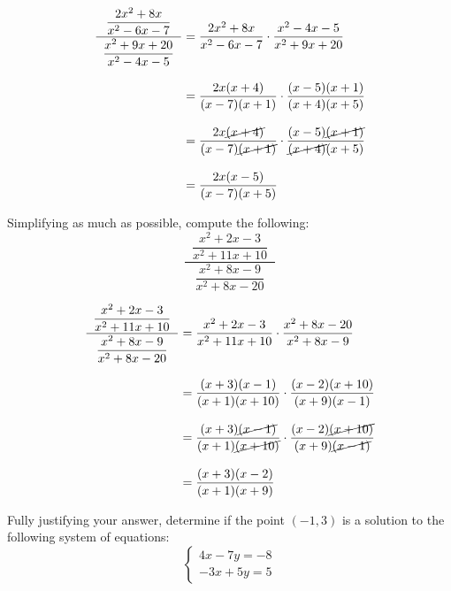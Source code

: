 \documentclass[11pt,letterpaper]{article}
\begin{document}
\sol
	\[
	\begin{aligned}
	\dfrac{\;\;\dfrac{2x^2 + 8x}{x^2 - 6x - 7}\;\;}{\;\;\dfrac{x^2 + 9x + 20}{x^2 - 4x - 5}\;\;}&= \dfrac{2x^2 + 8x}{x^2 - 6x - 7} \cdot \dfrac{x^2 - 4x - 5}{x^2 + 9x + 20} \\[0.3cm]
	&= \dfrac{2x(x + 4)}{(x - 7)(x + 1)} \cdot \dfrac{(x - 5)(x + 1)}{(x + 4)(x + 5)} \\[0.3cm]
	&= \dfrac{2x \cancel{(x + 4)}}{(x - 7) \cancel{(x + 1)}} \cdot \dfrac{(x - 5) \cancel{(x + 1)}}{\cancel{(x + 4)}(x + 5)} \\[0.3cm]
	&= \dfrac{2x(x - 5)}{(x - 7)(x + 5)}
	\end{aligned}
	\]



\newpage



 Simplifying as much as possible, compute the following:
	\[
	\dfrac{\;\;\dfrac{x^2 + 2x - 3}{x^2 + 11x + 10}\;\;}{\;\;\dfrac{x^2 + 8x - 9}{x^2 + 8x - 20}\;\;}
	\] \pspace

\sol
	\[
	\begin{aligned}
	\dfrac{\;\;\dfrac{x^2 + 2x - 3}{x^2 + 11x + 10}\;\;}{\;\;\dfrac{x^2 + 8x - 9}{x^2 + 8x - 20}\;\;}&= \dfrac{x^2 + 2x - 3}{x^2 + 11x + 10} \cdot \dfrac{x^2 + 8x - 20}{x^2 + 8x - 9} \\[0.3cm]
	&= \dfrac{(x + 3)(x - 1)}{(x + 1)(x + 10)} \cdot \dfrac{(x - 2)(x + 10)}{(x + 9)(x - 1)} \\[0.3cm]
	&= \dfrac{(x + 3) \cancel{(x - 1)}}{(x + 1) \cancel{(x + 10)}} \cdot \dfrac{(x - 2) \cancel{(x + 10)}}{(x + 9) \cancel{(x - 1)}} \\[0.3cm]
	&= \dfrac{(x + 3)(x - 2)}{(x + 1)(x + 9)}
	\end{aligned}
	\]



\newpage



 Fully justifying your answer, determine if the point $(-1, 3)$ is a solution to the following system of equations:
	\[
	\begin{cases}
	4x - 7y= -8 \\[0.3cm]
	-3x + 5y= 5
	\end{cases}
	\] \pspace
\end{document}
